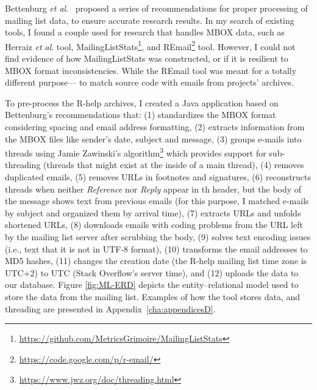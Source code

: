 \documentclass{sig-alternate-05-2015}
\begin{document}
	Bettenburg \textit{et al}.~\cite{Bettenburg2009} proposed a series of recommendations for proper processing of mailing list data, to ensure accurate research results.
	In my search of existing tools, I found a couple used for research that handles MBOX data, such as Herraiz \textit{et al}. tool, MailingListStats\footnote{\url{https://github.com/MetricsGrimoire/MailingListStats}}, and REmail\footnote{\url{https://code.google.com/p/r-email/}} tool.
	However, I could not find evidence of how MailingListStats was constructed, or if it is resilient to MBOX format inconsistencies. While the REmail tool was meant for a totally different purpose--- to match source code with emails from projects' archives.

	To pre-process the R-help archives, I created a Java application based on Bettenburg's recommendations that:
	(1) standardizes the MBOX format considering spacing and email address formatting,
	(2) extracts information from the MBOX files like sender's date, subject and message,
	(3) groups e-mails into threads using Jamie Zawinski's algorithm\footnote{\url{https://www.jwz.org/doc/threading.html}} which provides support for sub-threading (threads that might exist at the inside of a main thread),
	(4) removes duplicated emails,
	(5) removes URLs in footnotes and signatures,
	(6) reconstructs threads when neither \textit{Reference} nor \textit{Reply} appear in th header, but the body of the message shows text from previous emails (for this purpose, I matched e-mails by subject and organized them by arrival time),%
	(7) extracts URLs and unfolds shortened URLs,
	(8) downloads emails with coding problems from the URL left by the mailing list server after scrubbing the body,
	(9) solves text encoding issues (i.e., text that it is not in UTF-8 format),
	(10) transforms the email addresses to MD5 hashes,
	(11) changes the creation date (the R-help mailing list time zone is UTC+2) to UTC (Stack Overflow's server time),
	and (12) uploads the data to our database.
	Figure \ref{fig:ML-ERD} depicts the entity--relational model used to store the data from the mailing list.
	Examples of how the tool stores data, and threading are presented in Appendix~\ref{cha:appendicesD}.
\end{document}
